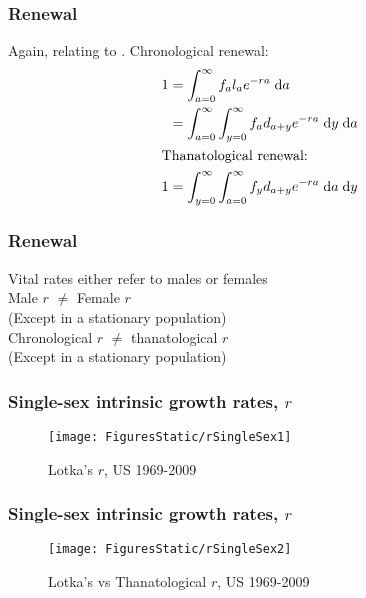 \documentclass{beamer}
\newcommand{\dd}{\; \mathrm{d}}
\begin{document}

\begin{frame}
\frametitle{Renewal}
Again, relating to \cite{sharpe1911problem}. Chronological renewal:
\begin{align}
1 &= \int_{a=0}^\infty f_al_ae^{-ra}\dd a \notag \\
  &= \int_{a=0}^\infty \int_{y=0}^\infty f_a d_{a+y}e^{-ra} \dd y \dd a \notag
  \\
  \intertext{Thanatological renewal:}
1 &= \int_{y=0}^\infty \int_{a=0}^\infty f_y d_{a+y}e^{-ra} \dd a \dd y
   \notag
 \end{align}
\end{frame}


\begin{frame}
\frametitle{Renewal}
 Vital rates either refer to males or females \\
\vspace{1em}
 Male $r$ $\ne$ Female $r$  \\
 \quad (Except in a stationary population) \\
\vspace{1em}
 Chronological $r$ $\ne$ thanatological $r$ \\
 \quad (Except in a stationary population)
\end{frame}


\begin{frame}
\frametitle{Single-sex intrinsic growth rates, $r$}
\vspace{-2em}
\begin{figure}
      \centering
      \caption*{Lotka's $r$, US 1969-2009}
      \texttt{[image: FiguresStatic/rSingleSex1]}
\end{figure}
\end{frame}

\begin{frame}
\frametitle{Single-sex intrinsic growth rates, $r$}
\vspace{-2em}
\begin{figure}
      \centering
      \caption*{Lotka's vs Thanatological $r$, US 1969-2009}
      \texttt{[image: FiguresStatic/rSingleSex2]}
\end{figure}
\end{frame}
\end{document}
